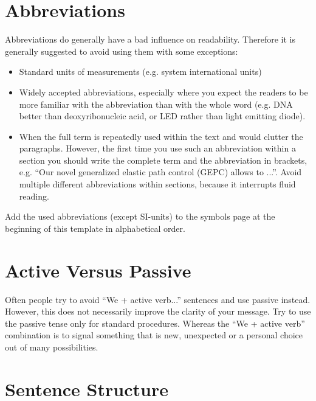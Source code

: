 \section{Abbreviations}

Abbreviations do generally have a bad influence on readability.
Therefore it is generally suggested to avoid using them with some exceptions:
\begin{itemize}
	\item Standard units of measurements (e.g. system international units)
	\item Widely accepted abbreviations, especially where you expect the readers to be more familiar with the abbreviation than with the whole word (e.g. DNA better than deoxyribonucleic acid, or LED rather than light emitting diode).
	\item When the full term is repeatedly used within the text and would clutter the paragraphs. However, the first time you use such an abbreviation within a section you should write the complete term and the abbreviation in brackets, e.g. ``Our novel generalized elastic path control (GEPC) allows to ...''.
Avoid multiple different abbreviations within sections, because it interrupts fluid reading.
\end{itemize}

Add the used abbreviations (except SI-units) to the symbols page at the beginning of this template in alphabetical order.

\section{Active Versus Passive}

Often people try to avoid ``We + active verb...'' sentences and use passive instead.
However, this does not necessarily improve the clarity of your message.
Try to use the passive tense only for standard procedures.
Whereas the ``We + active verb'' combination is to signal something that is new, unexpected or a personal choice out of many possibilities. 

\section{Sentence Structure}

